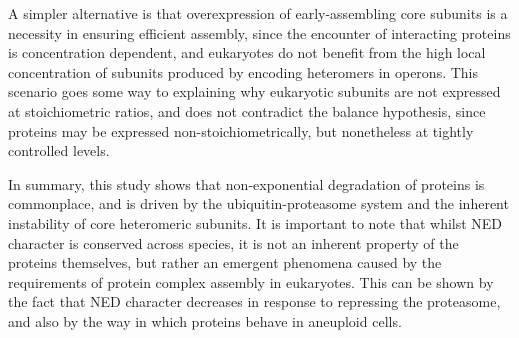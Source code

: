 \documentclass[a4paper,11pt,twoside,openright]{scrbook}
\begin{document}
A simpler alternative is that overexpression of early-assembling core subunits is a necessity in ensuring efficient assembly, since the encounter of interacting proteins is concentration dependent, and eukaryotes do not benefit from the high local concentration of subunits produced by encoding heteromers in operons. This scenario goes some way to explaining why eukaryotic subunits are not expressed at stoichiometric ratios, and does not contradict the balance hypothesis, since proteins may be expressed non-stoichiometrically, but nonetheless at tightly controlled levels.

In summary, this study shows that non-exponential degradation of proteins is commonplace, and is driven by the ubiquitin-proteasome system and the inherent instability of core heteromeric subunits. It is important to note that whilst NED character is conserved across species, it is not an inherent property of the proteins themselves, but rather an emergent phenomena caused by the requirements of protein complex assembly in eukaryotes. This can be shown by the fact that NED character decreases in response to repressing the proteasome, and also by the way in which proteins behave in aneuploid cells.

\end{document}
